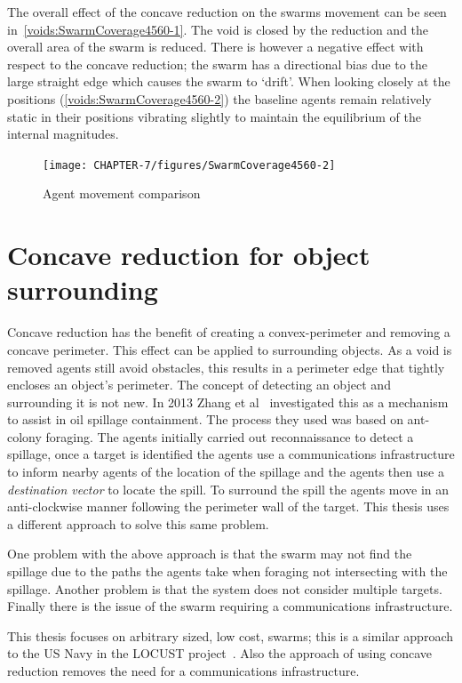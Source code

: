 The overall effect of the concave reduction on the swarms movement can be seen in~\autoref{voids:SwarmCoverage4560-1}. The void is closed by the reduction and the overall area of the swarm is reduced. There is however a negative effect with respect to the concave reduction; the swarm has a directional bias due to the large straight edge which causes the swarm to `drift'. When looking closely at the positions (\autoref{voids:SwarmCoverage4560-2}) the baseline agents remain relatively static in their positions vibrating slightly to maintain the equilibrium of the internal magnitudes. 
\begin{figure}[H]
\begin{center}
\texttt{[image: CHAPTER-7/figures/SwarmCoverage4560-2]}
\end{center}
\caption{Agent movement comparison\label{voids:SwarmCoverage4560-2}}
\end{figure}

\section{Concave reduction for object surrounding}\label{voids:ObjectSurrounding}
Concave reduction has the benefit of creating a convex-perimeter and removing a concave perimeter. This effect can be applied to surrounding objects. As a void is removed agents still avoid obstacles, this results in a perimeter edge that tightly encloses an object's perimeter. The concept of detecting an object and surrounding it is not new. In 2013 Zhang et al~\cite{ZFG:13} investigated this as a mechanism to assist in oil spillage containment. The process they used was based on ant-colony foraging. The agents initially carried out reconnaissance to detect a spillage, once a target is identified the agents use a communications infrastructure to inform nearby agents of the location of the spillage and the agents then use a \textit{destination vector} to locate the spill. To surround the spill the agents move in an anti-clockwise manner following the perimeter wall of the target. This thesis uses a different approach to solve this same problem.

One problem with the above approach is that the swarm may not find the spillage due to the paths the agents take when foraging not intersecting with the spillage. Another problem is that the system does not consider multiple targets. Finally there is the issue of the swarm requiring a communications infrastructure. 

This thesis focuses on arbitrary sized, low cost, swarms; this is a similar approach to the US Navy in the LOCUST project~\cite{MW:15, DS:15}. Also the approach of using concave reduction removes the need for a communications infrastructure. 

